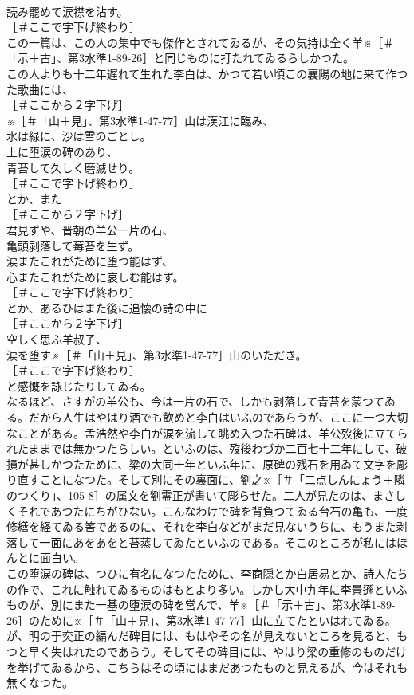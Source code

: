 \documentclass[8pt]{extreport}
\begin{document}
\begin{CJK}{UTF8}{min}
\\	読み罷めて涙襟を沾す。
\\	［＃ここで字下げ終わり］
\\	この一篇は、この人の集中でも傑作とされてゐるが、その気持は全く羊※［＃「示＋古」、第3水準1-89-26］と同じものに打たれてゐるらしかつた。
\\	この人よりも十二年遅れて生れた李白は、かつて若い頃この襄陽の地に来て作つた歌曲には、
\\	［＃ここから２字下げ］
\\	※［＃「山＋見」、第3水準1-47-77］山は漢江に臨み、
\\	水は緑に、沙は雪のごとし。
\\	上に堕涙の碑のあり、
\\	青苔して久しく磨滅せり。
\\	［＃ここで字下げ終わり］
\\	とか、また
\\	［＃ここから２字下げ］
\\	君見ずや、晋朝の羊公一片の石、
\\	亀頭剥落して莓苔を生ず。
\\	涙またこれがために堕つ能はず、
\\	心またこれがために哀しむ能はず。
\\	［＃ここで字下げ終わり］
\\	とか、あるひはまた後に追懐の詩の中に
\\	［＃ここから２字下げ］
\\	空しく思ふ羊叔子、
\\	涙を堕す※［＃「山＋見」、第3水準1-47-77］山のいただき。
\\	［＃ここで字下げ終わり］
\\	と感慨を詠じたりしてゐる。
\\	なるほど、さすがの羊公も、今は一片の石で、しかも剥落して青苔を蒙つてゐる。だから人生はやはり酒でも飲めと李白はいふのであらうが、ここに一つ大切なことがある。孟浩然や李白が涙を流して眺め入つた石碑は、羊公歿後に立てられたままでは無かつたらしい。といふのは、歿後わづか二百七十二年にして、破損が甚しかつたために、梁の大同十年といふ年に、原碑の残石を用ゐて文字を彫り直すことになつた。そして別にその裏面に、劉之※［＃「二点しんにょう＋隣のつくり」、105-8］の属文を劉霊正が書いて彫らせた。二人が見たのは、まさしくそれであつたにちがひない。こんなわけで碑を背負つてゐる台石の亀も、一度修繕を経てゐる筈であるのに、それを李白などがまだ見ないうちに、もうまた剥落して一面にあをあをと苔蒸してゐたといふのである。そこのところが私にはほんとに面白い。
\\	この堕涙の碑は、つひに有名になつたために、李商隠とか白居易とか、詩人たちの作で、これに触れてゐるものはもとより多い。しかし大中九年に李景遜といふものが、別にまた一基の堕涙の碑を営んで、羊※［＃「示＋古」、第3水準1-89-26］のために※［＃「山＋見」、第3水準1-47-77］山に立てたといはれてゐる。が、明の于奕正の編んだ碑目には、もはやその名が見えないところを見ると、もつと早く失はれたのであらう。そしてその碑目には、やはり梁の重修のものだけを挙げてゐるから、こちらはその頃にはまだあつたものと見えるが、今はそれも無くなつた。

\end{CJK}
\end{document}
